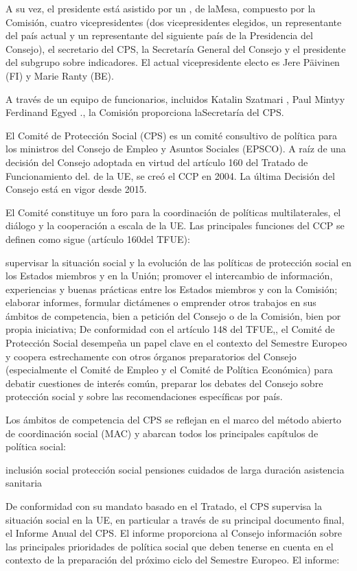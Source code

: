 \documentclass[10pt,a4paper]{article}
\begin{document}
A su vez, el presidente está asistido por un , de laMesa, compuesto por la Comisión, cuatro vicepresidentes (dos vicepresidentes elegidos, un representante del país actual y un representante del siguiente país de la Presidencia del Consejo), el secretario del CPS, la Secretaría General del Consejo y el presidente del subgrupo sobre indicadores. El actual vicepresidente electo es Jere Päivinen (FI) y Marie Ranty (BE).

A través de un equipo de funcionarios, incluidos Katalin Szatmari , Paul Mintyy Ferdinand Egyed ., la Comisión proporciona laSecretaría del CPS.

El Comité de Protección Social (CPS) es un comité consultivo de política para los ministros del Consejo de Empleo y Asuntos Sociales (EPSCO). A raíz de una decisión del Consejo adoptada en virtud del artículo 160 del Tratado de Funcionamiento del. de la UE, se creó el CCP en 2004. La última Decisión del Consejo está en vigor desde 2015.

El Comité constituye un foro para la coordinación de políticas multilaterales, el diálogo y la cooperación a escala de la UE. Las principales funciones del CCP se definen como sigue (artículo 160del TFUE): 

supervisar la situación social y la evolución de las políticas de protección social en los Estados miembros y en la Unión;
promover el intercambio de información, experiencias y buenas prácticas entre los Estados miembros y con la Comisión;
elaborar informes, formular dictámenes o emprender otros trabajos en sus ámbitos de competencia, bien a petición del Consejo o de la Comisión, bien por propia iniciativa;
De conformidad con el artículo 148 del TFUE,, el Comité de Protección Social desempeña un papel clave en el contexto del Semestre Europeo y coopera estrechamente con otros órganos preparatorios del Consejo (especialmente el Comité de Empleo y el Comité de Política Económica) para debatir cuestiones de interés común, preparar los debates del Consejo sobre protección social y sobre las recomendaciones específicas por país.

Los ámbitos de competencia del CPS se reflejan en el marco del método abierto de coordinación social (MAC) y abarcan todos los principales capítulos de política social:

inclusión social
protección social
pensiones
cuidados de larga duración
asistencia sanitaria

De conformidad con su mandato basado en el Tratado, el CPS supervisa la situación social en la UE, en particular a través de su principal documento final, el Informe Anual del CPS. El informe proporciona al Consejo información sobre las principales prioridades de política social que deben tenerse en cuenta en el contexto de la preparación del próximo ciclo del Semestre Europeo. El informe:
\end{document}
